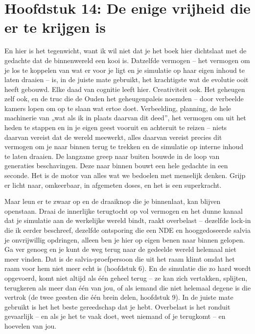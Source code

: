 \documentclass[11pt, twoside, openright]{book}
\begin{document}
\chapter*{Hoofdstuk 14: De enige vrijheid die er te krijgen is}

En hier is het tegenwicht, want ik wil niet dat je het boek hier dichtslaat met de gedachte dat de binnenwereld een kooi is. Datzelfde vermogen -- het vermogen om je los te koppelen van wat er voor je ligt en je simulatie op haar eigen inhoud te laten draaien -- is, in de juiste mate gebruikt, het krachtigste wat de evolutie ooit heeft gebouwd. Elke daad van cognitie leeft hier. Creativiteit ook. Het geheugen zelf ook, en de truc die de Ouden het geheugenpaleis noemden -- door verbeelde kamers lopen om op te slaan wat ertoe doet. Verbeelding, planning, de hele machinerie van „wat als ik in plaats daarvan dit deed”, het vermogen om uit het heden te stappen en in je eigen geest vooruit en achteruit te reizen -- niets daarvan vereist dat de wereld meewerkt, alles daarvan vereist precies dit vermogen om je naar binnen terug te trekken en de simulatie op interne inhoud te laten draaien. De langzame greep naar buiten bouwde in de loop van generaties beschavingen. Deze naar binnen bouwt een hele gedachte in een seconde. Het is de motor van alles wat we bedoelen met menselijk denken. Grijp er licht naar, omkeerbaar, in afgemeten doses, en het is een superkracht.

Maar leun er te zwaar op en de draaiknop die je binnenlaat, kan blijven openstaan. Draai de innerlijke terugtocht op vol vermogen en het dunne kanaal dat je simulatie aan de werkelijke wereld bindt, raakt overbelast -- dezelfde lock-in die ik eerder beschreef, dezelfde ontsporing die een NDE en hooggedoseerde salvia je onvrijwillig opdringen, alleen ben je hier op eigen benen naar binnen gelopen. Ga ver genoeg en je kunt de weg terug naar de gedeelde wereld helemaal niet meer vinden. Dat is de salvia-proefpersoon die uit het raam klimt omdat het raam voor hem niet meer echt is (hoofdstuk 6). En de simulatie die zo hard wordt opgevoerd, komt niet altijd als één geheel terug -- ze kan zich vertakken, splijten, terugkeren als meer dan één van jou, of als iemand die niet helemaal degene is die vertrok (de twee geesten die één brein delen, hoofdstuk 9). In de juiste mate gebruikt is het het beste gereedschap dat je hebt. Overbelast is het ronduit gevaarlijk -- en als je het te vaak doet, weet niemand of je terugkomt -- en hoevelen van jou.
\end{document}
